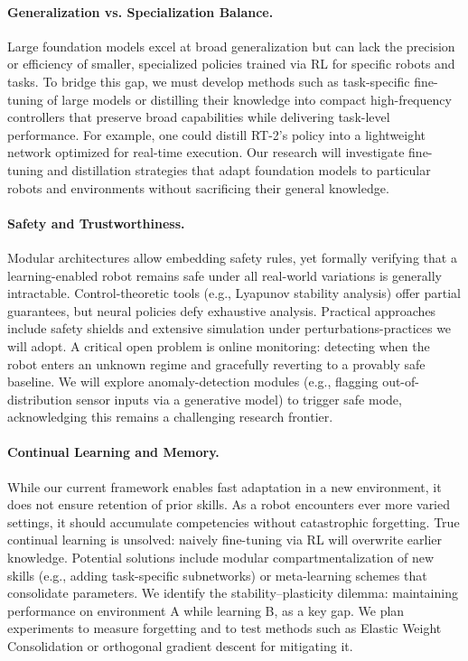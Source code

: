 \paragraph{Generalization vs. Specialization Balance.}
Large foundation models excel at broad generalization but can lack the precision or efficiency of smaller, specialized policies trained via \ac{RL} for specific robots and tasks. To bridge this gap, we must develop methods such as task-specific fine-tuning of large models or distilling their knowledge into compact high-frequency controllers that preserve broad capabilities while delivering task-level performance. For example, one could distill RT-2’s policy into a lightweight network optimized for real-time execution. Our research will investigate fine-tuning and distillation strategies that adapt foundation models to particular robots and environments without sacrificing their general knowledge.

\paragraph{Safety and Trustworthiness.}
Modular architectures allow embedding safety rules, yet formally verifying that a learning-enabled robot remains safe under all real-world variations is generally intractable. Control-theoretic tools (e.g., Lyapunov stability analysis) offer partial guarantees, but neural policies defy exhaustive analysis. Practical approaches include safety shields and extensive simulation under perturbations-practices we will adopt. A critical open problem is online monitoring: detecting when the robot enters an unknown regime and gracefully reverting to a provably safe baseline. We will explore anomaly-detection modules (e.g., flagging out-of-distribution sensor inputs via a generative model) to trigger safe mode, acknowledging this remains a challenging research frontier.

\paragraph{Continual Learning and Memory.}
While our current framework enables fast adaptation in a new environment, it does not ensure retention of prior skills. As a robot encounters ever more varied settings, it should accumulate competencies without catastrophic forgetting. True continual learning is unsolved: naively fine-tuning via \ac{RL} will overwrite earlier knowledge. Potential solutions include modular compartmentalization of new skills (e.g., adding task-specific subnetworks) or meta-learning schemes that consolidate parameters. We identify the stability–plasticity dilemma: maintaining performance on environment A while learning B, as a key gap. We plan experiments to measure forgetting and to test methods such as Elastic Weight Consolidation or orthogonal gradient descent for mitigating it.

